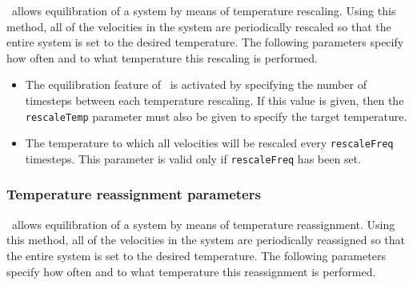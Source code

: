 \PDAC\ allows equilibration of a system by means of temperature 
rescaling.  Using this method, all of the velocities in the system 
are periodically rescaled so that the entire system is set to the 
desired temperature.  The following parameters specify how often 
and to what temperature this rescaling is performed.  

\begin{itemize}

\item
{}
{The equilibration feature of \PDAC\ is activated by 
specifying the number of timesteps between each temperature rescaling.  
If this value is given, then the {\tt rescaleTemp} parameter must also 
be given to specify the target temperature. }

\item
{}
{The temperature to which all velocities will be rescaled
every {\tt rescaleFreq} timesteps.  
This parameter is valid only if {\tt rescaleFreq} has been set.}

\end{itemize}

\subsubsection{Temperature reassignment parameters}

\PDAC\ allows equilibration of a system by means of temperature 
reassignment.  Using this method, all of the velocities in the system 
are periodically reassigned so that the entire system is set to the 
desired temperature.  The following parameters specify how often 
and to what temperature this reassignment is performed.  

